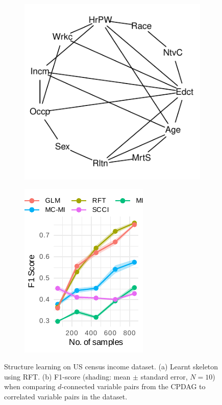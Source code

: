 \documentclass{beamer}
\begin{document}
\begin{frame}
	\frametitle{}
	\begin{figure}
		\centering
		\begin{subfigure}{0.5\textwidth}
			\centering
			\includegraphics[scale=0.85]{imgs/sl-adult-rf.pdf}
			\caption*{}
			\label{fig:sl_adult_model}
		\end{subfigure}%
		\begin{subfigure}{0.5\textwidth}
			\centering
			\includegraphics{imgs/adult_F1.pdf}
			\caption*{}
			\label{fig:sl_adult}
		\end{subfigure}
		\caption*{Structure learning on US census income dataset. (a)
		Learnt skeleton using RFT. (b) F1-score (shading: mean $\pm$
		standard error, $N=10$) when comparing $d$-connected variable
		pairs from the CPDAG to correlated variable pairs in the
		dataset.}
	\end{figure}
\end{frame}
\end{document}

